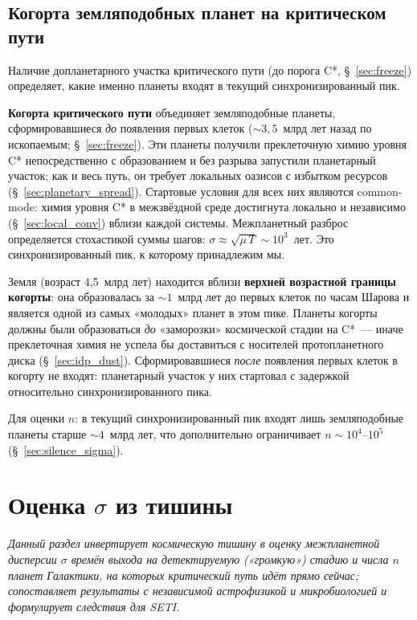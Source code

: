 \documentclass[12pt,a4paper]{article}
\begin{document}
\subsection{Когорта земляподобных планет на критическом пути}
\label{sec:bimodal}

Наличие допланетарного участка критического пути (до порога C*, \S~\ref{sec:freeze}) определяет, какие именно планеты входят в текущий синхронизированный пик.

\textbf{Когорта критического пути} объединяет земляподобные планеты, сформировавшиеся \emph{до} появления первых клеток ($\sim 3{,}5$~млрд лет назад по ископаемым; \S~\ref{sec:freeze}). Эти планеты получили преклеточную химию уровня C* непосредственно с образованием и без разрыва запустили планетарный участок; как и весь путь, он требует локальных оазисов с избытком ресурсов (\S~\ref{sec:planetary_spread}). Стартовые условия для всех них являются common-mode: химия уровня C* в межзвёздной среде достигнута локально и независимо (\S~\ref{sec:local_conv}) вблизи каждой системы. Межпланетный разброс определяется стохастикой суммы шагов: $\sigma \approx \sqrt{\mu\,T} \sim 10^3$~лет. Это синхронизированный пик, к которому принадлежим мы.

Земля (возраст 4,5~млрд лет) находится вблизи \textbf{верхней возрастной границы когорты}: она образовалась за $\sim 1$~млрд лет до первых клеток по часам Шарова и является одной из самых «молодых» планет в этом пике. Планеты когорты должны были образоваться \emph{до} «заморозки» космической стадии на C*~--- иначе преклеточная химия не успела бы доставиться с носителей протопланетного диска (\S~\ref{sec:idp_dust}). Сформировавшиеся \emph{после} появления первых клеток в когорту не входят: планетарный участок у них стартовал с задержкой относительно синхронизированного пика.

Для оценки $n$: в текущий синхронизированный пик входят лишь земляподобные планеты старше $\sim 4$~млрд лет, что дополнительно ограничивает $n \sim 10^4$--$10^5$ (\S~\ref{sec:silence_sigma}).

\section{Оценка \texorpdfstring{$\sigma$}{σ} из тишины}
\label{sec:inversion}

\textit{Данный раздел инвертирует космическую тишину в оценку межпланетной дисперсии $\sigma$ времён выхода на детектируемую («громкую») стадию и числа $n$ планет Галактики, на которых критический путь идёт прямо сейчас; сопоставляет результаты с независимой астрофизикой и микробиологией и формулирует следствия для SETI.}
\end{document}
